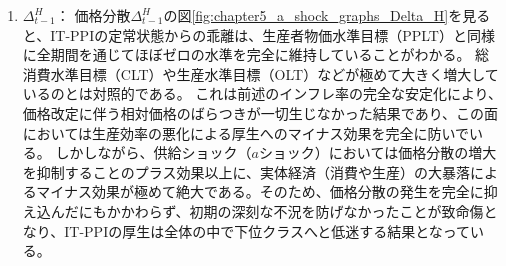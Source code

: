\begin{enumerate}
    \item
    \label{itm:chapter5_a_shock_policies_it_ppi_Delta_t_minus_1_H}
        \(\Delta_{t-1}^H\)：
        価格分散\(\Delta_{t-1}^H\)の図\ref{fig:chapter5_a_shock_graphs_Delta_H}を見ると、IT-PPIの定常状態からの乖離は、生産者物価水準目標（PPLT）と同様に全期間を通じてほぼゼロの水準を完全に維持していることがわかる。
        総消費水準目標（CLT）や生産水準目標（OLT）などが極めて大きく増大しているのとは対照的である。
        これは前述のインフレ率の完全な安定化により、価格改定に伴う相対価格のばらつきが一切生じなかった結果であり、この面においては生産効率の悪化による厚生へのマイナス効果を完全に防いでいる。
        しかしながら、供給ショック（\(a\)ショック）においては価格分散の増大を抑制することのプラス効果以上に、実体経済（消費や生産）の大暴落によるマイナス効果が極めて絶大である。そのため、価格分散の発生を完全に抑え込んだにもかかわらず、初期の深刻な不況を防げなかったことが致命傷となり、IT-PPIの厚生は全体の中で下位クラスへと低迷する結果となっている。
\end{enumerate}